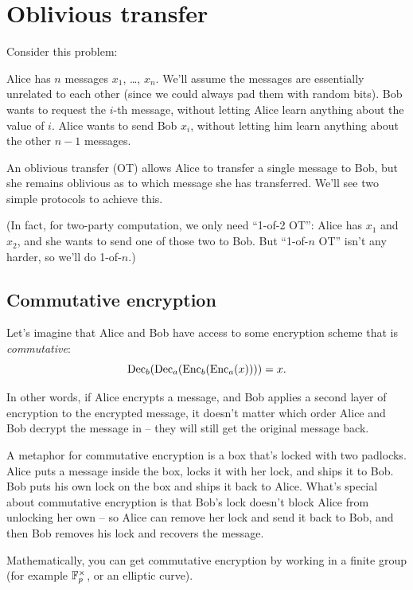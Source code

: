 \section{Oblivious transfer}\label{ot}
Consider this problem:
\begin{goal}{}{}
Alice has $n$ messages $x_{1}$, \dots, $x_{n}$. We'll assume the
messages are essentially unrelated to each other (since we could always
pad them with random bits).
Bob wants to request the $i$-th message,
without letting Alice learn anything about the value of $i$.
Alice wants to send Bob $x_{i}$,
without letting him learn anything about the other $n - 1$ messages.
\end{goal}
An \alert{oblivious transfer} (OT) allows
Alice to transfer a single message to Bob, but she remains oblivious as
to which message she has transferred. We'll see two simple protocols
to achieve this.

(In fact, for two-party computation, we only need ``1-of-2 OT'': Alice
has $x_{1}$ and $x_{2}$, and she wants to send one of those two to
Bob. But ``1-of-$n$ OT'' isn't any harder, so we'll do 1-of-$n$.)

\subsection{Commutative encryption}

Let's imagine that Alice and Bob have access to some encryption scheme
that is \emph{commutative}:
\[\operatorname{Dec}_{b}( \operatorname{Dec}_{a}( \operatorname{Enc}_{b}( \operatorname{Enc}_{a}(x) ) ) ) = x.\]

In other words, if Alice encrypts a message, and Bob applies a second
layer of encryption to the encrypted message, it doesn't matter which
order Alice and Bob decrypt the message in -- they will still get the
original message back.

A metaphor for commutative encryption is a box that's locked with two
padlocks. Alice puts a message inside the box, locks it with her lock,
and ships it to Bob. Bob puts his own lock on the box and ships it back
to Alice. What's special about commutative encryption is that Bob's
lock doesn't block Alice from unlocking her own -- so Alice can remove
her lock and send it back to Bob, and then Bob removes his lock and
recovers the message.

Mathematically, you can get commutative encryption by working in a
finite group (for example $\mathbb{F}_{p}^{\times}$, or an elliptic curve).


